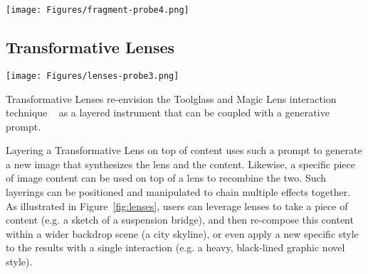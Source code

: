 \begin{figure*}[t]
    \texttt{[image: Figures/fragment-probe4.png]}
    \caption{Users can expand Fragments with variations of parameter values (1) in vertical columns, or request more suggestions for dimension types (2) at the end of the row. Users can further reuse and transfer Fragments to other content via drag-and-drop(3).}
    \label{fig:fragments}
\end{figure*}



\subsection{Transformative Lenses}




\begin{figure*}[tb]
  \centering
  \texttt{[image: Figures/lenses-probe3.png]}
  
  \caption{Transformative Lenses are placed over initial content, enabling users to "complete" illustrations from pieces of content (1). When users add elements to their composition, lenses regenerate to integrate it (2).}
  \label{fig:lenses}
\end{figure*}


Transformative Lenses re-envision the Toolglass and Magic Lens interaction technique ~\cite{bier2023toolglass} as a layered instrument that can be coupled with a generative prompt. 


Layering a Transformative Lens on top of content uses such a prompt to generate a new image that synthesizes the lens and the content. Likewise, a specific piece of image content can be used on top of a lens to recombine the two. Such layerings can be positioned and manipulated to chain multiple effects together. 
As illustrated in Figure~\ref{fig:lenses}, users can leverage lenses to take a piece of content (e.g. a sketch of a suspension bridge), and then re-compose this content within a wider backdrop scene (a city skyline), or even apply a new specific style to the results with a single interaction (e.g. a heavy, black-lined graphic novel style). 

